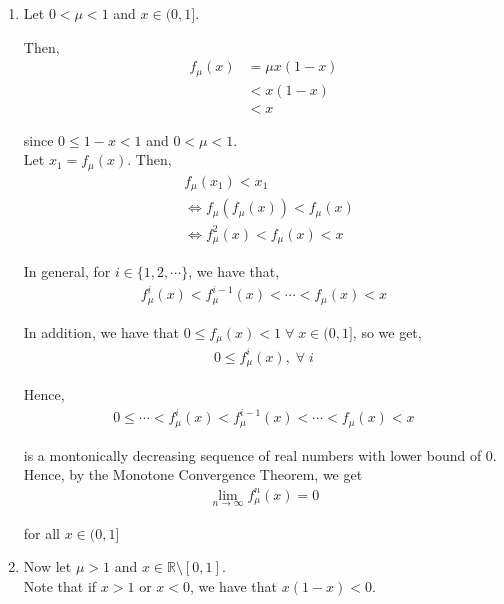 \documentclass[12pt]{article}
\newenvironment{problem}[2][Problem]{\begin{trivlist}
\item[\hskip \labelsep {\bfseries #1}\hskip \labelsep {\bfseries #2.}]}{\end{trivlist}}
\begin{document}
\begin{problem}{3}
\end{problem}

\begin{enumerate}[label=(\alph*)]

\item Let $0 < \mu < 1$ and $x \in (0, 1]$.

Then,
\begin{align*}
f_{\mu}(x) &= \mu x(1-x)\\
&< x(1-x)\\
&< x
\end{align*}

since $0 \leq 1 - x < 1$ and $0 < \mu < 1$.\\

Let $x_1 = f_{\mu}(x)$. Then,
\begin{align*}
&f_{\mu}(x_1) < x_1\\
&\iff f_{\mu}(f_{\mu}(x)) < f_{\mu}(x)\\
&\iff f^2_{\mu}(x) < f_{\mu}(x) < x
\end{align*}

In general, for $i \in \{1, 2, \cdots\}$, we have that,
\begin{align*}
f^i_{\mu}(x) < f^{i-1}_{\mu}(x) < \cdots < f_{\mu}(x) < x
\end{align*}

In addition, we have that $0 \leq f_{\mu}(x) < 1 \; \forall \; x \in (0, 1]$, so we get,
\begin{align*}
0 \leq f^i_{\mu}(x), \; \forall \; i
\end{align*}

Hence,
\begin{align*}
0 \leq \cdots < f^i_{\mu}(x) < f^{i-1}_{\mu}(x) < \cdots < f_{\mu}(x) < x
\end{align*}

is a montonically decreasing sequence of real numbers with lower bound of $0$.\\

Hence, by the Monotone Convergence Theorem, we get
\begin{align*}
\lim_{n \to \infty} f^n_{\mu}(x) = 0
\end{align*} 

for all $x \in (0, 1]$

\item Now let $\mu > 1$ and $x \in \mathbb{R} \setminus [0, 1]$.\\

Note that if $x > 1$ or $x < 0$, we have that $x(1-x) < 0$.\\


\end{enumerate}
\end{document}
